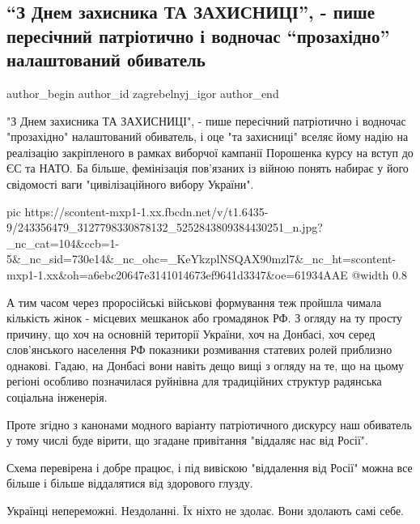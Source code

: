  
 
 
 
 
 
\subsection{\enquote{З Днем захисника ТА ЗАХИСНИЦІ}, - пише пересічний патріотично і водночас \enquote{прозахідно} налаштований обиватель}
\label{sec:14_10_2021.fb.zagrebelnyj_igor.1.den_zaschitnika}
 
\ifcmt
 author_begin
   author_id zagrebelnyj_igor
 author_end
\fi

"З Днем захисника ТА ЗАХИСНИЦІ", - пише пересічний патріотично і водночас
"прозахідно" налаштований обиватель, і оце "та захисниці" вселяє йому надію на
реалізацію закріпленого в рамках виборчої кампанії Порошенка курсу на вступ до
ЄС та НАТО. Ба більше, фемінізація пов'язаних із війною понять набирає у його
свідомості ваги "цивілізаційного вибору України".

\ifcmt
  pic https://scontent-mxp1-1.xx.fbcdn.net/v/t1.6435-9/243356479_3127798330878132_5252843809384430251_n.jpg?_nc_cat=104&ccb=1-5&_nc_sid=730e14&_nc_ohc=_KeYkzplNSQAX90mzl7&_nc_ht=scontent-mxp1-1.xx&oh=a6ebc20647e3141014673ef9641d3347&oe=61934AAE
  @width 0.8
\fi

А тим часом через проросійські військові формування теж пройшла чимала
кількість жінок - місцевих мешканок або громадянок РФ. З огляду на ту просту
причину, що хоч на основній території України, хоч на Донбасі, хоч серед
слов'янського населення РФ показники розмивання статевих ролей приблизно
однакові. Гадаю, на Донбасі вони навіть дещо вищі з огляду на те, що на цьому
регіоні особливо позначилася руйнівна для традиційних структур радянська
соціальна інженерія.

Проте згідно з канонами модного варіанту патріотичного дискурсу наш обиватель у
тому числі буде вірити, що згадане привітання "віддаляє нас від Росії". 

Схема перевірена і добре працює, і під вивіскою "віддалення від Росії" можна
все більше і більше віддалятися від здорового глузду.

\begin{cmtfront}

Українці непереможні. Нездоланні. Їх ніхто не здолає. Вони здолають самі себе.
	
\end{cmtfront}

